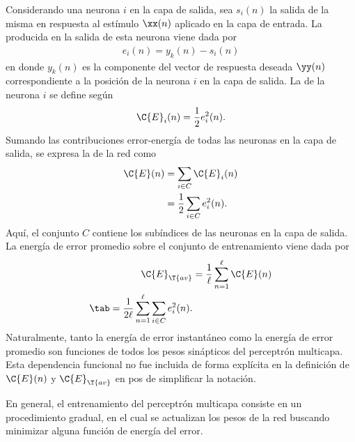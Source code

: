 Considerando una neurona $i$ en la capa de salida, sea $s_i(n)$ la
salida de la misma en respuesta al estímulo $\xx(n)$ aplicado en la
capa de entrada.
La
 producida en la salida de esta neurona viene dada
por
%
\begin{align}\label{e2:error-signal-neuron} %
  e_i(n)=y_{k}(n)-s_{i}(n)
\end{align}
%
en donde $y_k(n)$ es la componente del vector de respuesta deseada
$\yy(n)$ correspondiente a la posición de la neurona $i$ en la capa de
salida.
La  de la neurona $i$ se define según
%
\begin{align}\label{e2:error-energy-neuron} %
  \C{E}_i(n)=\frac{1}{2}e^2_i(n).
\end{align}
%
Sumando las contribuciones error-energía de todas las neuronas en la
capa de salida, se expresa la 
de la red como
%
\begin{align}\label{e2:error-energy-net} %
  \C{E}(n)&=\sum_{i\in C}\C{E}_i(n) \\
  &=\frac{1}{2}\sum_{i\in C}e^2_i(n).
\end{align}
%
Aquí, el conjunto $C$ contiene los subíndices de las
neuronas en la capa de salida. La energía de error promedio sobre el
conjunto de entrenamiento
viene dada por
%
\begin{align}\label{e2:average-energy-net} %
  \C{E}_{\T{av}}&=\frac{1}{\ell}\sum_{n=1}^\ell\C{E}(n) \\
  \tab=\frac{1}{2\ell} \sum_{n=1}^\ell \sum_{i\in C}e^2_i(n).
\end{align}
%
Naturalmente, tanto la energía de error instantáneo como la energía de
error promedio son funciones de todos los pesos sinápticos del
perceptrón multicapa. Esta dependencia funcional no fue incluida de
forma explícita en la definición de $\C{E}(n)$ y
$\C{E}_{\T{av}}$ en pos de simplificar la notación.

En general, el entrenamiento del perceptrón multicapa consiste
en un procedimiento gradual, en el cual se actualizan los
pesos de la red buscando minimizar alguna función de energía del error.
